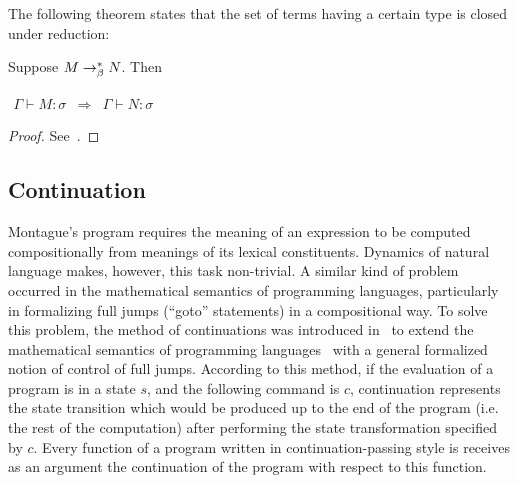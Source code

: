 The following theorem states that the set of terms having a certain type is closed under reduction:
\begin{theorem} Suppose $M \rightarrow^{*}_\beta N$. Then 
\begin{center}
$
\begin{array}{rcl}
\Gamma \vdash M: \sigma &\Longrightarrow & \Gamma \vdash N: \sigma
\end{array}
$
\end{center}
\end{theorem}
\begin{proof} See~\cite[p.41]{Barendregt:1992:Lambda-Calculi-with-Types}.
\end{proof}

\subsection{Continuation}

Montague's program requires the meaning of an expression to be computed compositionally from meanings of its lexical constituents. Dynamics of natural language makes, however, this task non-trivial. A similar kind of problem occurred in the mathematical semantics of programming languages, particularly in formalizing full jumps (``goto'' statements) in a compositional way. To solve this problem, the method of continuations was introduced in~\cite{StracheyWadsworth:1974:Continuations:-A-Mathematical-Semantics-for-Handling-Full-Jumps} to extend the mathematical semantics of programming languages~\cite{ScottStrachey:1971:Toward-a-Mathematical-Semantics-for-Computer-Languages} with a general formalized notion of control of full jumps. According to this method, if the evaluation of a program is in a state $s$, and the following command is $c$, continuation represents the state transition which would be produced up to the end of the program (i.e. the rest of the computation) after performing the state transformation specified by $c$. Every function of a program written in continuation-passing style is receives as an argument the continuation of the program with respect to this function. 


